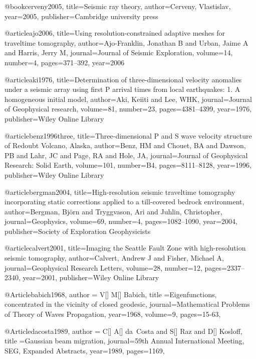 @book{cerveny2005,
  title={Seismic ray theory},
  author={Cerveny, Vlastislav},
  year={2005},
  publisher={Cambridge university press}
}


@article{ajo2006,
  title={Using resolution-constrained adaptive meshes for traveltime tomography},
  author={Ajo-Franklin, Jonathan B and Urban, Jaime A and Harris, Jerry M},
  journal={Journal of Seismic Exploration},
  volume={14},
  number={4},
  pages={371--392},
  year={2006}
}

@article{aki1976,
  title={Determination of three-dimensional velocity anomalies under a seismic array using first P arrival times from local earthquakes: 1. A homogeneous initial model},
  author={Aki, Keiiti and Lee, WHK},
  journal={Journal of Geophysical research},
  volume={81},
  number={23},
  pages={4381--4399},
  year={1976},
  publisher={Wiley Online Library}
}


@article{benz1996three,
  title={Three-dimensional P and S wave velocity structure of Redoubt Volcano, Alaska},
  author={Benz, HM and Chouet, BA and Dawson, PB and Lahr, JC and Page, RA and Hole, JA},
  journal={Journal of Geophysical Research: Solid Earth},
  volume={101},
  number={B4},
  pages={8111--8128},
  year={1996},
  publisher={Wiley Online Library}
}

@article{bergman2004,
  title={High-resolution seismic traveltime tomography incorporating static corrections applied to a till-covered bedrock environment},
  author={Bergman, Bj{\"o}rn and Tryggvason, Ari and Juhlin, Christopher},
  journal={Geophysics},
  volume={69},
  number={4},
  pages={1082--1090},
  year={2004},
  publisher={Society of Exploration Geophysicists}
}



@article{calvert2001,
  title={Imaging the Seattle Fault Zone with high-resolution seismic tomography},
  author={Calvert, Andrew J and Fisher, Michael A},
  journal={Geophysical Research Letters},
  volume={28},
  number={12},
  pages={2337--2340},
  year={2001},
  publisher={Wiley Online Library}
}





@Article{babich1968,
  author = {V[] M[] Babich},
  title ={Eigenfunctions, concentrated in the vicinity of closed geodesic},
  journal={Mathematical Problems of Theory of Waves Propagation},
  year=1968,
  volume=9,
  pages={15-63},
}

@Article{dacosta1989,
  author = {C[] A[] da~Costa and S[] Raz and D[] Kosloff},
  title ={Gaussian beam migration},
  journal={59th Annual International Meeting, SEG, Expanded Abstracts},
  year=1989,
  pages={1169},
}



